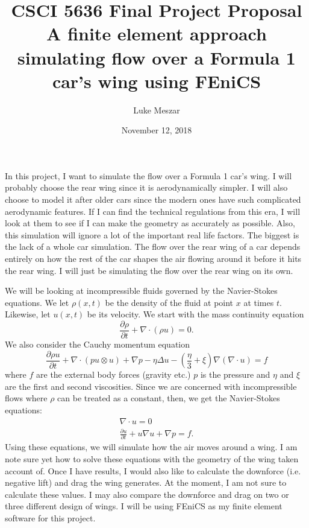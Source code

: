 \documentclass[12pt]{article}
\title{CSCI 5636 Final Project Proposal \\
\large A finite element approach simulating flow over a Formula 1 car's wing using FEniCS}
\author{Luke Meszar}
\date{November 12, 2018}
\theoremstyle{definition}
\numberwithin{equation}{section}
\begin{document}
	\maketitle
	In this project, I want to simulate the flow over a Formula 1 car's wing. I will probably choose the rear wing since it is aerodynamically simpler. I will also choose to model it after older cars since the modern ones have such complicated aerodynamic features. If I can find the technical regulations from this era, I will look at them to see if I can make the geometry as accurately as possible. Also, this simulation will ignore a lot of the important real life factors. The biggest is the lack of a whole car simulation. The flow over the rear wing of a car depends entirely on how the rest of the car shapes the air flowing around it before it hits the rear wing. I will just be simulating the flow over the rear wing on its own.
	
	We will be looking at incompressible fluids governed by the Navier-Stokes equations. We let $\rho(x,t)$ be the density of the fluid at point $x$ at times $t$. Likewise, let $u(x,t)$ be its velocity. We start with the mass continuity equation
	\[\frac{\partial \rho}{\partial t}+\nabla \cdot (\rho u) = 0.\]
	We also consider the Cauchy momentum equation 
	\[\frac{\partial \rho u}{\partial t} + \nabla \cdot (pu \otimes u) + \nabla p - \eta \Delta u - \left(\frac{\eta}{3}+\xi\right)\nabla(\nabla\cdot u) = f\]
	where $f$ are the external body forces (gravity etc.) $p$ is the pressure and $\eta$ and $\xi$ are the first and second viscosities. Since we are concerned with incompressible flows where $\rho$ can be treated as a constant, then, we get the Navier-Stokes equations:
	\begin{gather*}
	\nabla \cdot u = 0 \\
	\frac{\partial u}{\partial t} + u\nabla u + \nabla p = f.
	\end{gather*}
	Using these equations, we will simulate how the air moves around a wing. I am note sure yet how to solve these equations with the geometry of the wing taken account of. Once I have results, I would also like to calculate the downforce (i.e. negative lift) and drag the wing generates. At the moment, I am not sure to calculate these values. I may also compare the downforce and drag on two or three different design of wings. I will be using FEniCS as my finite element software for this project. 
	
	
	\nocite{*}
\end{document}
